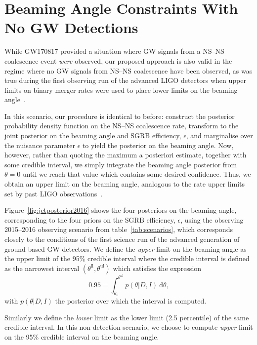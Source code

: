 \documentclass[twocolumn]{aastex61}
\newcommand{\diff}{{\mathrm d}}
\newcommand{\BNS}{\ac{NS}--\ac{NS}\xspace}
\begin{document}
\section{Beaming Angle Constraints With No \ac{GW} Detections}
\label{sec:beaming_limits}
While GW170817 provided a situation where \ac{GW} signals from a \BNS
coalescence event \emph{were} observed, our proposed approach is also
valid in the regime where no \ac{GW} signals from \BNS coalescence
have been observed, as was true during the first observing run of the
advanced LIGO detectors when upper limits on binary merger rates were
used to place lower limits on the beaming angle~\cite{Abbott:2016ymx}.

In this scenario, our procedure is identical to before:
construct the posterior probability density function on the \BNS
coalescence rate, transform to the joint posterior on the beaming
angle and \ac{SGRB} efficiency, $\epsilon$, and marginalise over the
nuisance parameter $\epsilon$ to yield the posterior on the beaming
angle.  Now, however, rather than quoting the maximum a posteriori
estimate, together with some credible interval, we simply integrate
the beaming angle posterior from $\theta=0$ until we reach that value
which contains some desired confidence.  Thus, we obtain an upper
limit on the beaming angle, analogous to the rate upper limits set by
past LIGO observations~\cite{Colaboration:2011np}.


Figure~\ref{fig:jetposterior2016} shows the four posteriors on the
beaming angle, corresponding to the four priors on the \ac{SGRB}
efficiency, $\epsilon$, using the observing 2015--2016 observing
scenario from table~\ref{tab:scenarios}, which corresponds closely
to the conditions of the first science run of the advanced generation
of ground based \ac{GW} detectors.  We define the \emph{upper} limit
on the beaming angle as the upper limit of the 95\% credible interval
where the credible interval is defined as the narrowest interval
$(\theta^{\mathrm{ll}}, \theta^{\mathrm{ul}})$ which satisfies the expression
\begin{equation}
    \label{eq:beaming_upper_limit}
    0.95 = \int_{\theta_{\mathrm{ll}}}^{\theta^{\mathrm{ul}}} p(\theta|D,I)~\diff \theta,
\end{equation}
with $p(\theta|D,I)$ the posterior over which the interval is
computed.

Similarly we define the \emph{lower} limit as the lower
limit (2.5 percentile) of the same credible interval.  In this
non-detection scenario, we choose to compute \emph{upper} limit on the
95\% credible interval on the beaming angle.
\end{document}
